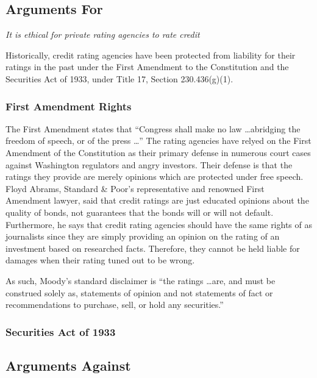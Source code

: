 \documentclass[11pt]{article}
\begin{document}
\begin{multicols}{2}
\subsection{Arguments For}

\textit{It is ethical for private rating agencies to rate credit}

Historically, credit rating agencies have been protected from liability for their ratings in the past under the First Amendment to the Constitution and the Securities Act of 1933, under Title 17, Section 230.436(g)(1).  

\subsubsection{First Amendment Rights}

The First Amendment states that ``Congress shall make no law \ldots abridging the freedom of speech, or of the press \ldots'' The rating agencies have relyed on the First Amendment of the Constitution as their primary defense in numerous court cases against Washington regulators and angry investors. Their defense is that the ratings they provide are merely opinions which are protected under free speech. \cite{CivilLiability, CRS} Floyd Abrams, Standard \& Poor's representative and renowned First Amendment lawyer, said that credit ratings are just educated opinions about the quality of bonds, not guarantees that the bonds will or will not default.  Furthermore, he says that credit rating agencies should have the same rights of as journalists since they are simply providing an opinion on the rating of an investment based on researched facts.  Therefore, they cannot be held liable for damages when their rating tuned out to be wrong.  \cite{nyTimesFirstAmendment} 

As such, Moody's standard disclaimer is ``the ratings \ldots are, and must be construed solely as, statements of opinion and not statements of fact or recommendations to purchase, sell, or hold any securities.'' \cite[p. 120]{govtReport}

\subsubsection{Securities Act of 1933}

\subsection{Arguments Against}


\end{multicols}
\end{document}
